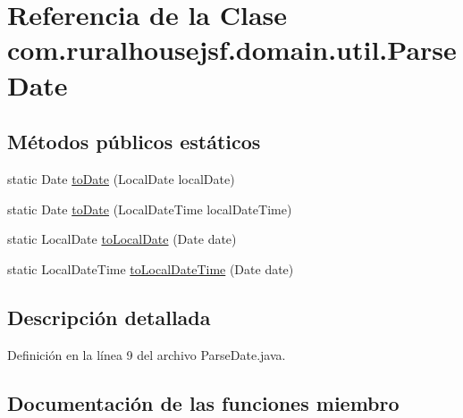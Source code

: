 \hypertarget{classcom_1_1ruralhousejsf_1_1domain_1_1util_1_1_parse_date}{}\section{Referencia de la Clase com.\+ruralhousejsf.\+domain.\+util.\+Parse\+Date}
\label{classcom_1_1ruralhousejsf_1_1domain_1_1util_1_1_parse_date}
\subsection*{Métodos públicos estáticos}
\begin{DoxyCompactItemize}
\item 
static Date \mbox{\hyperlink{classcom_1_1ruralhousejsf_1_1domain_1_1util_1_1_parse_date_a3a918df6cf2d9658332d7d5bee975d58}{to\+Date}} (Local\+Date local\+Date)
\item 
static Date \mbox{\hyperlink{classcom_1_1ruralhousejsf_1_1domain_1_1util_1_1_parse_date_ade5cf2cc6741490bf01834ac0ebf9dfe}{to\+Date}} (Local\+Date\+Time local\+Date\+Time)
\item 
static Local\+Date \mbox{\hyperlink{classcom_1_1ruralhousejsf_1_1domain_1_1util_1_1_parse_date_ab162361ec67bde08f594d22c04ccc283}{to\+Local\+Date}} (Date date)
\item 
static Local\+Date\+Time \mbox{\hyperlink{classcom_1_1ruralhousejsf_1_1domain_1_1util_1_1_parse_date_aacf06ccd03aba32238d32068f0fe1ca2}{to\+Local\+Date\+Time}} (Date date)
\end{DoxyCompactItemize}


\subsection{Descripción detallada}


Definición en la línea 9 del archivo Parse\+Date.\+java.



\subsection{Documentación de las funciones miembro}
\mbox{\label{classcom_1_1ruralhousejsf_1_1domain_1_1util_1_1_parse_date_a3a918df6cf2d9658332d7d5bee975d58}} 
